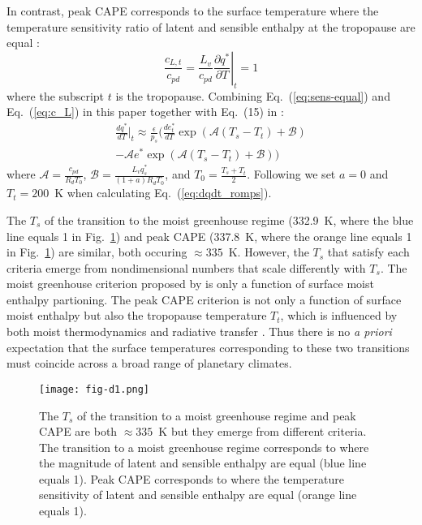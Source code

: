 \documentclass[]{ametsocV6.1}
\begin{document}
In contrast, peak CAPE corresponds to the surface temperature where the temperature sensitivity ratio of latent and sensible enthalpy at the tropopause are equal \citep[which works well for $a\ll1$,][]{romps2016}:
\begin{equation}
\frac{c_{L,t}}{c_{pd}} = \frac{L_v}{c_{pd}} \left. \frac{\partial q^*}{\partial T} \right|_t = 1
\label{eq:sens-equal}
\end{equation}
where the subscript $t$ is the tropopause. Combining Eq.~(\ref{eq:sens-equal}) and Eq.~(\ref{eq:c_L}) in this paper together with Eq.~(15) in \cite{romps2016}:
\begin{multline}
\frac{d q^*}{d T} \biggl|_t \approx \frac{\epsilon}{p_s} \biggl( \frac{d e_t^*}{d T} \exp( \mathcal{A} (T_s - T_t) + \mathcal{B})\\ - \mathcal{A} e^* \exp( \mathcal{A} (T_s - T_t) + \mathcal{B}) \biggl)
\label{eq:dqdt_romps}
\end{multline}
where $\mathcal{A} = \frac{c_{pd}}{R_d T_0}$, $\mathcal{B} = \frac{L_v q_s^*}{(1 + a) R_d T_0}$, and $T_0 = \frac{T_s + T_t}{2}$. Following \cite{romps2016} we set $a=0$ and $T_t=200$~K when calculating Eq.~(\ref{eq:dqdt_romps}).

The $T_s$ of the transition to the moist greenhouse regime (332.9~K, where the blue line equals 1 in Fig.~\ref{fig:fig-d1}) and peak CAPE (337.8~K, where the orange line equals 1 in Fig.~\ref{fig:fig-d1}) are similar, both occuring $\approx335$~K. However, the $T_s$ that satisfy each criteria emerge from nondimensional numbers that scale differently with $T_s$. The moist greenhouse criterion proposed by \cite{wordsworth2013} is only a function of surface moist enthalpy partioning. The peak CAPE criterion is not only a function of surface moist enthalpy but also the tropopause temperature $T_t$, which is influenced by both moist thermodynamics and radiative transfer \citep[e.g.,][]{held1982, hu2019a}. Thus there is no \textit{a priori} expectation that the surface temperatures corresponding to these two transitions must coincide across a broad range of planetary climates.

\begin{figure}[htbp]
 \centering
 \texttt{[image: fig-d1.png]}
 \caption{The $T_s$ of the transition to a moist greenhouse regime and peak CAPE are both $\approx 335$~K but they emerge from different criteria. The transition to a moist greenhouse regime corresponds to where the magnitude of latent and sensible enthalpy are equal (blue line equals 1). Peak CAPE corresponds to where the temperature sensitivity of latent and sensible enthalpy are equal (orange line equals 1).}\label{fig:fig-d1}
\end{figure}

\clearpage




\end{document}
